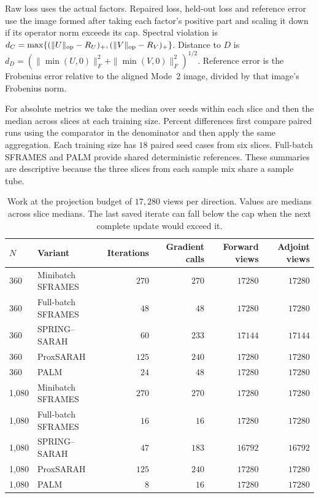 \documentclass[11pt]{article}
\begin{document}
Raw loss uses the actual factors. Repaired loss, held-out loss and reference
error use the image formed after taking each factor's positive part and
scaling it down if its operator norm exceeds its cap. Spectral violation is
\(d_C=\max\{(\|U\|_{\rm op}-R_U)_+,
(\|V\|_{\rm op}-R_V)_+\}\). Distance to \(D\) is
\(d_D=(\|\min(U,0)\|_F^2+\|\min(V,0)\|_F^2)^{1/2}\).
Reference error is the Frobenius error relative to the aligned Mode~2 image,
divided by that image's Frobenius norm.

For absolute metrics we take the median over seeds within each slice and then
the median across slices at each training size. Percent differences first
compare paired runs using the comparator in the denominator and then apply
the same aggregation. Each training size has \(18\) paired seed cases from
six slices. Full-batch SFRAMES and PALM provide shared deterministic
references. These summaries are descriptive because the three slices from
each sample mix share a sample tube.

\begin{table}[!htbp]
\centering
\caption{Work at the projection budget of \(17{,}280\) views per direction. Values are medians across slice medians. The last saved iterate can fall below the cap when the next complete update would exceed it.}
\label{tab:work}
\small
\setlength{\tabcolsep}{4pt}
\begin{tabular}{@{}llrrrr@{}}
\toprule
$N$ & Variant & Iterations & Gradient calls & Forward views & Adjoint views \\
\midrule
360 & Minibatch SFRAMES & $270$ & $270$ & $17280$ & $17280$ \\
360 & Full-batch SFRAMES & $48$ & $48$ & $17280$ & $17280$ \\
360 & SPRING--SARAH & $60$ & $233$ & $17144$ & $17144$ \\
360 & ProxSARAH & $125$ & $240$ & $17280$ & $17280$ \\
360 & PALM & $24$ & $48$ & $17280$ & $17280$ \\
1{,}080 & Minibatch SFRAMES & $270$ & $270$ & $17280$ & $17280$ \\
1{,}080 & Full-batch SFRAMES & $16$ & $16$ & $17280$ & $17280$ \\
1{,}080 & SPRING--SARAH & $47$ & $183$ & $16792$ & $16792$ \\
1{,}080 & ProxSARAH & $125$ & $240$ & $17280$ & $17280$ \\
1{,}080 & PALM & $8$ & $16$ & $17280$ & $17280$ \\
\bottomrule
\end{tabular}
\end{table}
\end{document}
